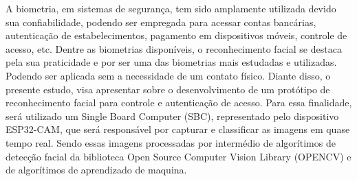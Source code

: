 
\begin{resumoutfpr}%

A biometria, em sistemas de segurança, tem sido amplamente utilizada devido sua 
confiabilidade, podendo ser empregada para acessar contas bancárias, autenticação de 
estabelecimentos, pagamento em dispositivos móveis, controle de acesso, etc. 
Dentre as biometrias disponíveis, o reconhecimento facial se destaca pela sua 
praticidade e por ser uma das biometrias mais estudadas e utilizadas. 
Podendo ser aplicada sem a necessidade de um contato físico. Diante disso, 
o presente estudo, visa apresentar sobre o desenvolvimento de um protótipo de 
reconhecimento facial para controle e autenticação de acesso. Para essa finalidade, 
será utilizado um Single Board Computer (SBC), representado pelo dispositivo 
ESP32-CAM, que será responsável por capturar e classificar as imagens em quase tempo 
real. Sendo essas imagens processadas por intermédio de algorítimos de detecção facial 
da biblioteca Open Source Computer Vision Library (OPENCV) e de algorítimos 
de aprendizado de maquina.
\end{resumoutfpr}

